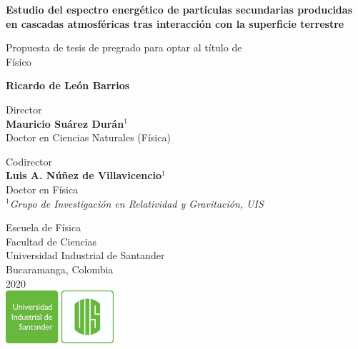 \documentclass{report}
\begin{document}
\begin{titlepage}
   \begin{center}
       \vspace*{1cm}
       
       
       \Large
       \textbf{Estudio del espectro energético de partículas secundarias producidas en cascadas atmosféricas tras interacción con la superficie terrestre}
       
 
       \vspace{1.5cm}
 
       \normalsize
       Propuesta de tesis de pregrado para optar al título de \\
       Físico
       
       
       \large
       \textbf{Ricardo de León Barrios}
       
       \vspace{1cm}
       Director\\
       \textbf{Mauricio Suárez Durán}$^1$\\
       Doctor en Ciencias Naturales (Física)
       
       \vspace{1cm}
       Codirector\\
       \textbf{Luis A. Núñez de Villavicencio}$^1$\\
       Doctor en Física\\
       
       \vspace{1cm}
       $^1$\textit{Grupo de Investigación en Relatividad y Gravitación, UIS}
 
       \vfill
       
       
 
       \vspace{0.8cm}
 
       
 
       \normalsize
       Escuela de Física\\
       Facultad de Ciencias\\
       Universidad Industrial de Santander\\
       Bucaramanga, Colombia\\
       2020\\
       \vspace{0.3cm}
       \includegraphics[width=0.3\textwidth]{logo/logoUIS.png}
 
   \end{center}
\end{titlepage}
\end{document}
